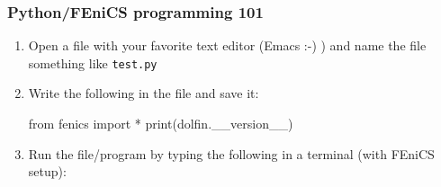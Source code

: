 \begin{frame}[fragile]
\frametitle{Python/FEniCS programming 101}

\begin{enumerate}
\item
  Open a file with your favorite text editor (Emacs :-) ) and name the
  file something like \texttt{test.py}
  \bigskip
\item
  Write the following in the file and save it:
\vspace{-1em}
  \begin{python}
from fenics import *
print(dolfin.__version__)
  \end{python}
  \bigskip
\item
  Run the file/program by typing the following in a terminal (with
  FEniCS setup):
\vspace{-1em}
\end{enumerate}

\end{frame}
